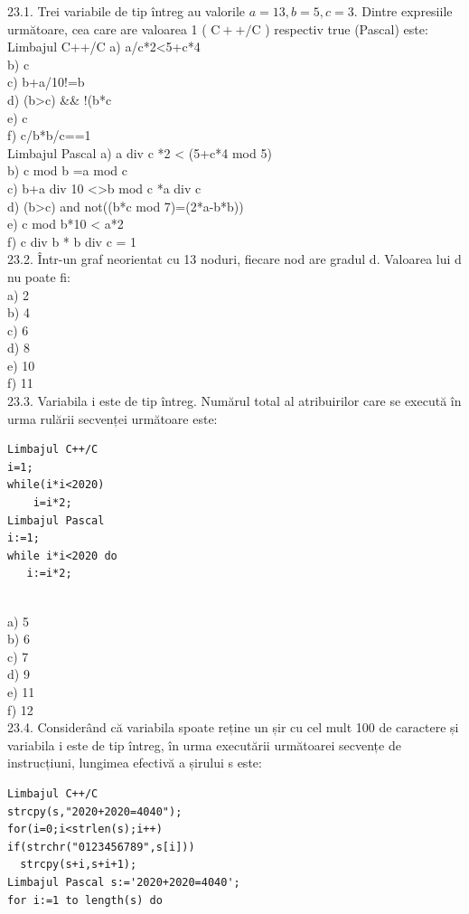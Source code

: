 {{23.1. Trei variabile de tip întreg au valorile $a=13, b=5, c=3$. Dintre expresiile următoare, cea care are valoarea 1 ( $\mathrm{C}++/ \mathrm{C}$ ) respectiv true (Pascal) este:
\\
Limbajul C++/C 
a) a/c*2<5+c*4%
\\
b) c%
\\
c) b+a/10!=b%
\\
d) (b>c) && !(b*c%
\\ 
e) c%
\\
f) c/b*b/c==1 
\\
Limbajul Pascal 
a) a div c *2 < (5+c*4 mod 5) 
\\
b) c mod b =a mod c 
\\
c) b+a div 10 <>b mod c *a div c
\\ 
d) (b>c) and not((b*c mod 7)=(2*a-b*b))
\\
e) c mod b*10 < a*2 
\\
f) c div b * b div c = 1 
\\
23.2. Într-un graf neorientat cu 13 noduri, fiecare nod are gradul d. Valoarea lui d nu poate fi:
\\
a) 2
\\
b) 4
\\
c) 6
\\
d) 8
\\
e) 10
\\
f) 11
\\
23.3. Variabila i este de tip întreg. Numărul total al atribuirilor care se execută în urma rulării secvenței următoare este:
\begin{verbatim}
Limbajul C++/C
i=1;
while(i*i<2020)
    i=i*2;
Limbajul Pascal 
i:=1; 
while i*i<2020 do 
   i:=i*2;
\end{verbatim}
\\
a) 5
\\
b) 6
\\
c) 7
\\
d) 9
\\
e) 11
\\
f) 12
\\
23.4. Considerând că variabila spoate reține un șir cu cel mult 100 de caractere și variabila i este de tip întreg, în urma executării următoarei secvențe de instrucțiuni, lungimea efectivă a șirului s este:
\begin{verbatim}
Limbajul C++/C
strcpy(s,"2020+2020=4040"); 
for(i=0;i<strlen(s);i++) 
if(strchr("0123456789",s[i])) 
  strcpy(s+i,s+i+1); 
Limbajul Pascal s:='2020+2020=4040'; 
for i:=1 to length(s) do 

\end{verbatim}}}
